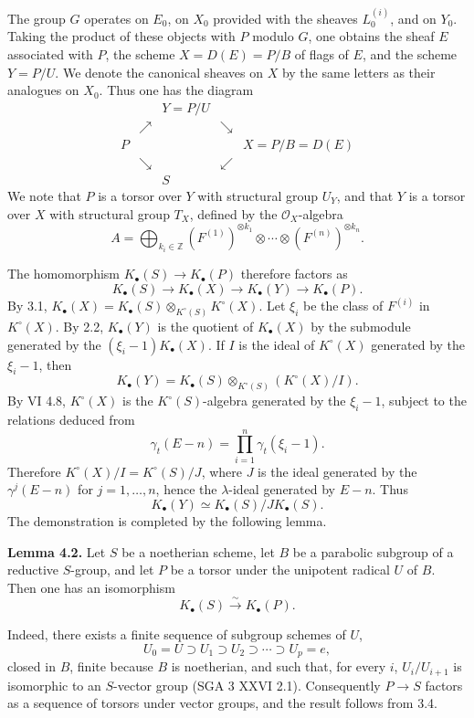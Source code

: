 \documentclass[11pt]{article}
\begin{document}
The group $G$ operates on $E_0$, on $X_0$ provided with the sheaves $L_0^{(i)}$, and on $Y_0$. Taking the product of these objects with $P$ modulo $G$, one obtains the sheaf $E$ associated with $P$, the scheme $X=D(E)=P/B$ of flags of $E$, and the scheme $Y=P/U$. We denote the canonical sheaves on $X$ by the same letters as their analogues on $X_0$. Thus one has the diagram
\[
\begin{array}{ccccc}
&& Y=P/U &&\\[-0.2em]
& \nearrow && \searrow &\\[-0.2em]
P &&&& X=P/B=D(E)\\[-0.2em]
& \searrow && \swarrow &\\[-0.2em]
&& S &&
\end{array}
\]
We note that $P$ is a torsor over $Y$ with structural group $U_Y$, and that $Y$ is a torsor over $X$ with structural group $T_X$, defined by the $\mathcal O_X$-algebra
\[
 A=\bigoplus_{k_i\in\mathbb Z}(F^{(1)})^{\otimes k_1}\otimes\cdots\otimes(F^{(n)})^{\otimes k_n}.
\]

The homomorphism $K_\bullet(S)\to K_\bullet(P)$ therefore factors as
\[
 K_\bullet(S)\longrightarrow K_\bullet(X)\longrightarrow K_\bullet(Y)\longrightarrow K_\bullet(P).
\]
By 3.1, $K_\bullet(X)=K_\bullet(S)\otimes_{K^\circ(S)}K^\circ(X)$. Let $\xi_i$ be the class of $F^{(i)}$ in $K^\circ(X)$. By 2.2, $K_\bullet(Y)$ is the quotient of $K_\bullet(X)$ by the submodule generated by the $(\xi_i-1)K_\bullet(X)$. If $I$ is the ideal of $K^\circ(X)$ generated by the $\xi_i-1$, then
\[
 K_\bullet(Y)=K_\bullet(S)\otimes_{K^\circ(S)}(K^\circ(X)/I).
\]
By VI 4.8, $K^\circ(X)$ is the $K^\circ(S)$-algebra generated by the $\xi_i-1$, subject to the relations deduced from
\[
 \gamma_t(E-n)=\prod_{i=1}^n\gamma_t(\xi_i-1).
\]
Therefore $K^\circ(X)/I=K^\circ(S)/J$, where $J$ is the ideal generated by the $\gamma^j(E-n)$ for $j=1,\ldots,n$, hence the $\lambda$-ideal generated by $E-n$. Thus
\[
 K_\bullet(Y)\simeq K_\bullet(S)/J K_\bullet(S).
\]
The demonstration is completed by the following lemma.

\textbf{Lemma 4.2.} Let $S$ be a noetherian scheme, let $B$ be a parabolic subgroup of a reductive $S$-group, and let $P$ be a torsor under the unipotent radical $U$ of $B$. Then one has an isomorphism
\[
 K_\bullet(S)\xrightarrow{\sim}K_\bullet(P).
\]

Indeed, there exists a finite sequence of subgroup schemes of $U$,
\[
 U_0=U\supset U_1\supset U_2\supset\cdots\supset U_p=e,
\]
closed in $B$, finite because $B$ is noetherian, and such that, for every $i$, $U_i/U_{i+1}$ is isomorphic to an $S$-vector group (SGA 3 XXVI 2.1). Consequently $P\to S$ factors as a sequence of torsors under vector groups, and the result follows from 3.4.
\end{document}
